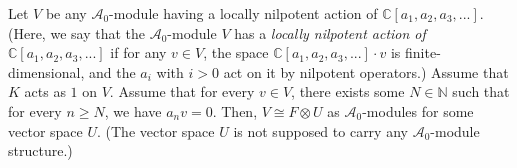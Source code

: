 \documentclass[etingof-lie.tex]{subfiles}
\begin{document}
\begin{proposition}
\label{prop.V=F(X)U}Let $V$ be any $\mathcal{A}_{0}$-module having a locally
nilpotent action of $\mathbb{C}\left[  a_{1},a_{2},a_{3},...\right]  $. (Here,
we say that the $\mathcal{A}_{0}$-module $V$ has a \textit{locally nilpotent
action of$\mathbb{\ }$}$\mathbb{C}\left[  a_{1},a_{2},a_{3},...\right]  $ if
for any $v\in V$, the space $\mathbb{C}\left[  a_{1},a_{2},a_{3},...\right]
\cdot v$ is finite-dimensional, and the $a_{i}$ with $i>0$ act on it by
nilpotent operators.) Assume that $K$ acts as $1$ on $V$. Assume that for
every $v\in V$, there exists some $N\in\mathbb{N}$ such that for every $n\geq
N$, we have $a_{n}v=0$. Then, $V\cong F\otimes U$ as $\mathcal{A}_{0}$-modules
for some vector space $U$. (The vector space $U$ is not supposed to carry any
$\mathcal{A}_{0}$-module structure.)
\end{proposition}
\end{document}

